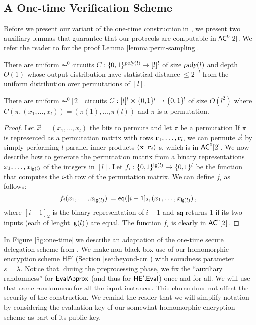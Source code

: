 \subsection{A One-time Verification Scheme}

Before we present our variant of the one-time construction in \cite{ckv10}, we present two auxiliary lemmas that guarantee that our protocols are computable in ${\mathsf{AC}}^0[2]$. We refer the reader to \cite{hag91,matias91} for the proof Lemma \ref{lemma:perm-sampling}. %

\begin{lemma}{\cite{hag91,matias91}}
\label{lemma:perm-sampling}
There are uniform $\AC^0$ circuits $C: \{0, 1\}^{{\textsl{poly}}(l)}\to [l]^l$ of size ${\textsl{poly}}(l)$ and depth $O(1)$ whose output distribution have statistical distance $\leq 2^{-l}$ from the uniform distribution over permutations of $[l]$.
\end{lemma}

\begin{lemma}
\label{lemma:perm-evaluation}
There are uniform $\AC^0[2]$ circuits $C: [l]^l \times \{0, 1\}^l \to \{0, 1\}^l$ of size $O(l^2)$ where $C(\pi, (x_1,\dots, x_l)) = (\pi(1),\dots,\pi(l))$ and $\pi$ is a permutation.
\end{lemma}
\begin{proof}
Let $\vec{x} = (x_1,\dots,x_l)$ the bits to permute and let $\pi$ be a permutation
If $\pi$ is represented as a permutation matrix with rows $\mathbf{r}_1,\dots,\mathbf{r}_l$, we can permute $\vec{x}$ by simply performing $l$ parallel inner products $\langle \mathbf{x} \, , \mathbf{r}_i \rangle$-s, which is in ${\mathsf{AC}}^0[2]$.
We now describe how to generate the permutation matrix from a binary representations $x_1,\dots,x_{\mathsf{lg}(l)}$ of the integers in $[l]$.
Let $f_i : \{0, 1\}^{\mathsf{lg}(l)} \to \{0, 1\}^l$ be the function that computes the $i$-th row of the permutation matrix. We can define $f_i$ as follows:
\[
    f_i(x_1,\dots,x_{\mathsf{lg}(l)}) \vcentcolon= \mathsf{eq}([i-1]_2, (x_1,\dots,x_{\mathsf{lg}(l)}) \, ,
\]
where $[i-1]_2$ is the binary representation of $i-1$ and $\mathsf{eq}$ returns 1 if its two inputs (each of lenght $\mathsf{lg}(l)$) are equal.
The function $f_i$ is clearly in ${\mathsf{AC}}^0[2]$.
\end{proof}

In Figure \ref{fig:one-time} we describe an adaptation of the one-time secure delegation scheme from \cite{ckv10}. We make non-black box use of our homomorphic encryption scheme $\mathsf{HE'}$ (Section \ref{sec:beyond-cm}) with soundness parameter $s= \lambda$. Notice that. during the preprocessing phase, we fix the ``auxiliary randomness'' for $\mathsf{EvalApprox}$ (and thus for $\mathsf{HE'.Eval}$) once and for all. We will use that same randomness for all the input instances. This choice does not affect the security of the construction.
We remind the reader that we will simplify notation by considering the evaluation key of our somewhat homomorphic encryption scheme as part of its public key.

